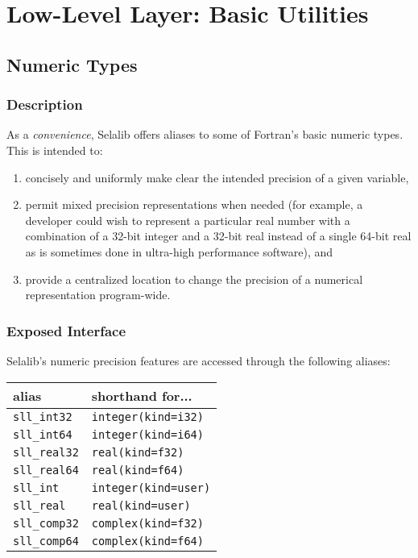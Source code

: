 \documentclass[]{report}   %
\begin{document}

\chapter{Low-Level Layer: Basic Utilities}           %


\section{Numeric Types}     %
\subsection{Description}
As a \emph{convenience}, Selalib offers aliases to some of Fortran's basic numeric types. This is intended to:
\begin{enumerate}
\item concisely and uniformly make clear the intended precision of a given variable, 
\item permit mixed precision representations when needed (for example, a developer could wish to represent a particular real number with a combination of a 32-bit integer and a 32-bit real instead of a single 64-bit real as is sometimes done in ultra-high performance software), and
\item provide a centralized location to change the precision of a numerical representation program-wide.
\end{enumerate}

\subsection{Exposed Interface}         %
Selalib's numeric precision features are accessed through the following aliases:

\vspace{+0.5cm}
\begin{tabular}{l l}
alias & shorthand for... \\
\hline
\verb+sll_int32+ & \verb+integer(kind=i32)+ \\
\verb+sll_int64+ & \verb+integer(kind=i64)+ \\
\verb+sll_real32+ & \verb+real(kind=f32)+ \\
\verb+sll_real64+ & \verb+real(kind=f64)+ \\
\verb+sll_int+  & \verb+integer(kind=user)+ \\
\verb+sll_real+ & \verb+real(kind=user)+ \\
\verb+sll_comp32+ & \verb+complex(kind=f32)+\\
\verb+sll_comp64+ & \verb+complex(kind=f64)+\\
\hline
\end{tabular}
\vspace{+0.5cm}
\end{document}
